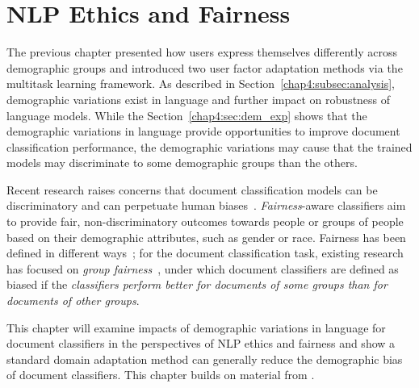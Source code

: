 \chapter{NLP Ethics and Fairness}
\label{chp:fairness}

The previous chapter presented how users express themselves differently across demographic groups and introduced two user factor adaptation methods via the multitask learning framework. 
As described in Section~\ref{chap4:subsec:analysis}, demographic variations exist in language and
further impact on robustness of language models.
While the Section~\ref{chap4:sec:dem_exp} shows that the demographic variations in language provide opportunities to improve document classification performance, the demographic variations may cause that the trained models may discriminate to some demographic groups than the others.

Recent research raises concerns that document classification models can be discriminatory and can perpetuate human biases~\cite{dixon2018measuring, kiritchenko2018examining, park2018reducing, garg2019counterfactual, borkan2019nuanced}.
\textit{Fairness}-aware classifiers aim to provide fair, non-discriminatory outcomes towards people or groups of people based on their demographic attributes, such as gender or race. 
Fairness has been defined in different ways~\cite{hardt2016equality}; for the document classification task, existing research~\cite{dixon2018measuring, kiritchenko2018examining, park2018reducing, garg2019counterfactual, heindorf2019debiasing} has focused on \textit{group fairness}~\cite{chouldechova2018frontiers}, under which document classifiers are defined as biased if the \textit{classifiers perform better for documents of some groups than for documents of other groups}.

This chapter will examine impacts of demographic variations in language for document classifiers in the perspectives of NLP ethics and fairness and show a standard domain adaptation method can generally reduce the demographic bias of document classifiers.
This chapter builds on material from \cite{huang2020multilingual}.

